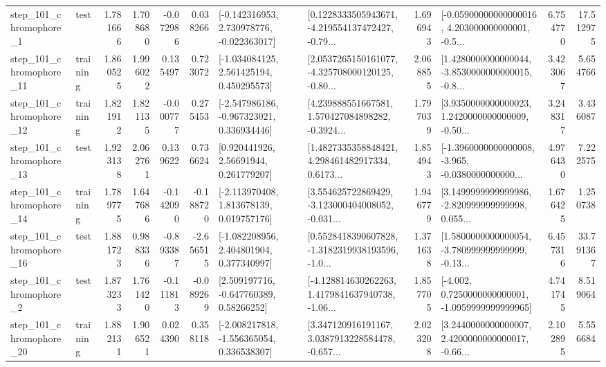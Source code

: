 \begin{tabular}{llrrrrllrlrr}
   step\_101\_chromophore\_1 &      test &      1.781666 &    1.708680 &     -0.072986 &  0.038266 &   [-0.142316953, 2.730978776, -0.022363017] &  [0.1228333505943671, -4.219554137472427, -0.79... &       1.696943 &  [-0.05900000000000016, 4.203000000000001, -0.5... &            6.754770 &         17.512975 \\
  step\_101\_chromophore\_11 &  training &      1.860525 &    1.996022 &      0.135497 &  0.723072 &    [-1.034084125, 2.561425194, 0.450295573] &  [2.0537265150161077, -4.325708000120125, -0.80... &       2.068855 &  [1.4280000000000044, -3.8530000000000015, -0.8... &            3.423067 &          5.654766 \\
  step\_101\_chromophore\_12 &  training &      1.821912 &    1.821135 &     -0.000777 &  0.275453 &   [-2.547986186, -0.967323021, 0.336934446] &  [4.239888551667581, 1.570427084898282, -0.3924... &       1.797039 &  [3.9350000000000023, 1.2420000000000009, -0.50... &            3.248317 &          3.436087 \\
  step\_101\_chromophore\_13 &      test &      1.923138 &    2.062761 &      0.139622 &  0.736624 &      [0.920441926, 2.56691944, 0.261779207] &  [1.4827335358848421, 4.298461482917334, 0.6173... &       1.854943 &  [-1.3960000000000008, -3.965, -0.0380000000000... &            4.976430 &          7.222575 \\
  step\_101\_chromophore\_14 &  training &      1.789775 &    1.647686 &     -0.142090 & -0.188720 &    [-2.113970408, 1.813678139, 0.019757176] &  [3.554625722869429, -3.123000404008052, -0.031... &       1.946779 &  [3.1499999999999986, -2.820999999999998, 0.055... &            1.676425 &          1.250738 \\
  step\_101\_chromophore\_16 &      test &      1.881723 &    0.988336 &     -0.893387 & -2.656515 &    [-1.082208956, 2.404801904, 0.377340997] &  [0.5528418390607828, -1.3182319938193596, -1.0... &       1.371638 &  [1.5800000000000054, -3.780999999999999, -0.13... &            6.457316 &         33.791367 \\
   step\_101\_chromophore\_2 &      test &      1.873233 &    1.761420 &     -0.111813 & -0.089269 &     [2.509197716, -0.647760389, 0.58266252] &  [-4.128814630262263, 1.4179841637940738, -1.06... &       1.857705 &  [-4.002, 0.7250000000000001, -1.0959999999999965] &            4.741745 &          8.519064 \\
  step\_101\_chromophore\_20 &  training &      1.882131 &    1.906521 &      0.024390 &  0.358118 &   [-2.008217818, -1.556365054, 0.336538307] &  [3.347120916191167, 3.0387913228584478, -0.657... &       2.023208 &  [3.2440000000000007, 2.4200000000000017, -0.66... &            2.102895 &          5.556684 \\

\end{tabular}
